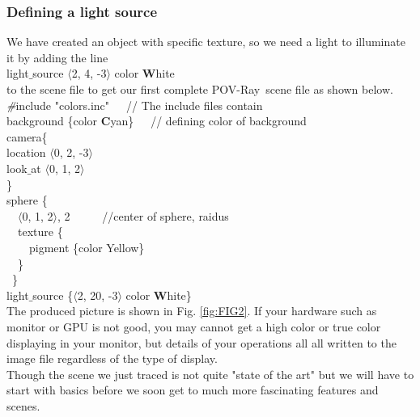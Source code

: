\documentclass[fleqn,10pt]{wlscirep}
\newcommand*{\PV}{POV-Ray}
\begin{document}
\subsubsection{Defining a light source}
We have created an object with specific texture, so we need a light to illuminate it by adding the line \\
\textcolor[rgb]{0.2,0.1,1}{light$\_$source {$\langle$2, 4, -3$\rangle$ color \textbf{W}hite}} \\
to the scene file to get our first complete \PV~scene file as shown below.\\
\textcolor[rgb]{0.2,0.1,1}{\emph{\#}include "colors.inc"}\ \ \     // The include files contain \\
\textcolor[rgb]{0.2,0.1,1}{background \{color \textbf{C}yan\}}\ \ \ // defining color of background \\
\textcolor[rgb]{0.2,0.1,1}{camera\{}  \\
\textcolor[rgb]{0.2,0.1,1}{  location $\langle$0, 2, -3$\rangle$}  \\
\textcolor[rgb]{0.2,0.1,1}{  look$\_$at $\langle$0, 1, 2$\rangle$}  \\
\textcolor[rgb]{0.2,0.1,1}{\}} \\
\textcolor[rgb]{0.2,0.1,1}{sphere \{} \\
\textcolor[rgb]{0.2,0.1,1}{\ \ $\langle$0, 1, 2$\rangle$, 2}    \ \ \ \ \  //center of sphere, raidus\\
\textcolor[rgb]{0.2,0.1,1}{\ \ texture \{} \\
\textcolor[rgb]{0.2,0.1,1}{\ \ \ \ pigment \{color Yellow\}} \\
\textcolor[rgb]{0.2,0.1,1}{\ \ \}} \\
\textcolor[rgb]{0.2,0.1,1}{\ \}} \\
\textcolor[rgb]{0.2,0.1,1}{light$\_$source \{$\langle$2, 20, -3$\rangle$ color \textbf{W}hite\}} \\
\newline
The produced picture is shown in Fig. \ref{fig:FIG2}. If your hardware such as monitor or GPU is not good, you may cannot get a high color or true color displaying in your monitor, but details of your operations all all written to the image file regardless of the type of display.\\

Though the scene we just traced is not quite "state of the art" but we will have to start with basics before we soon get to much more fascinating features and scenes.
\end{document}

